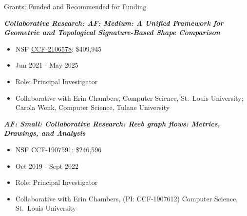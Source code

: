 \documentclass{resume} %
\begin{document}
\begin{rSection}{Grants: Funded and Recommended for Funding}




\textbf{\textit{Collaborative Research: AF: Medium: A Unified Framework for Geometric and Topological Signature-Based Shape Comparison}}
\vspace{-.1in}
\begin{itemize}{}{\leftmargin=0em}
   \itemsep -0.6em %
   \item
NSF \href{https://nsf.gov/awardsearch/showAward?AWD_ID=2106578}{CCF-2106578}:  \$409,945
\item
Jun 2021 - May 2025
   \item
Role: Principal Investigator
\item Collaborative with
  Erin Chambers, Computer Science, St.~Louis University; Carola Wenk, Computer Science, Tulane University

\end{itemize}

\textbf{\textit{AF: Small: Collaborative Research: Reeb graph flows: Metrics, Drawings, and Analysis}}
\vspace{-.1in}
\begin{itemize}{}{\leftmargin=0em}
   \itemsep -0.6em %
   \item
NSF \href{https://nsf.gov/awardsearch/showAward?AWD_ID=1907591}{CCF-1907591}:  \$246,596
\item
Oct 2019 - Sept 2022
   \item
Role: Principal Investigator
\item Collaborative with
  Erin Chambers, (PI: CCF-1907612) Computer Science, St.~Louis University

\end{itemize}


\end{rSection}
\end{document}
